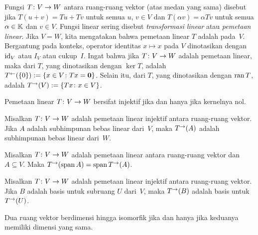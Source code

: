 \begin{defn}\label{defn_op_vsp} Fungsi $T\colon V \rightarrow W$ antara ruang-ruang vektor (atas medan yang sama) disebut
 jika $T(u + v) = Tu + Tv$ untuk semua $u$, $v \in V$ dan $T(\alpha v) = \alpha Tv$
untuk semua $\alpha \in \mathbb{K}$ dan $v \in V$. Fungsi linear sering disebut
\emph{transformasi linear} atau \emph{pemetaan linear}. Jika $V = W$, kita mengatakan bahwa pemetaan linear $T$ adalah
 pada~$V$. Bergantung pada konteks, operator identitas $x \mapsto x$ pada $V$ dinotasikan
dengan $\operatorname{id}_{V}$ atau $I_V$ atau cukup~$I$. Ingat bahwa jika $T\colon V \rightarrow W$ adalah pemetaan linear, maka
 dari $T$, yang dinotasikan dengan $\ker T$, adalah $T^{\gets}(\{0\}) := \{x \in V\colon Tx = \mathbf{0}\}$. Selain itu,
 dari $T$, yang dinotasikan dengan $\operatorname{ran} T$, adalah $T^{\rightarrow}(V) := \{Tx\colon x \in V\}$.
\end{defn}

\begin{prop} Pemetaan linear $T\colon V \rightarrow W$ bersifat injektif jika dan hanya jika kernelnya nol.
\end{prop}

\begin{prop} Misalkan $T\colon V \rightarrow W$ adalah pemetaan linear injektif antara ruang-ruang vektor. Jika $A$ adalah subhimpunan bebas linear
dari~$V$, maka $T^\rightarrow(A)$ adalah subhimpunan bebas linear dari~$W$.
\end{prop}

\begin{prop} Misalkan $T\colon V \rightarrow W$ adalah pemetaan linear antara ruang-ruang vektor dan $A \subseteq V$.
Maka $T^\rightarrow(\operatorname{span} A) = \operatorname{span} T^\rightarrow(A)$.
\end{prop}

\begin{prop} Misalkan $T\colon V \rightarrow W$ adalah pemetaan linear injektif antara ruang-ruang vektor. Jika $B$ adalah basis
untuk subruang $U$ dari~$V$, maka $T^\rightarrow(B)$ adalah basis untuk~$T^\rightarrow(U)$.
\end{prop}

\begin{prop} Dua ruang vektor berdimensi hingga isomorfik jika dan hanya jika keduanya memiliki dimensi yang sama.
\end{prop}

